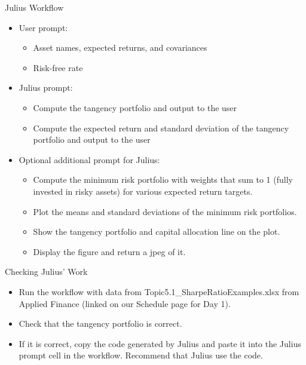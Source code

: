 \documentclass[10pt]{beamer}
\begin{document}
\begin{frame}{Julius Workflow}
  \begin{itemize}
  \item User prompt:
  \begin{itemize}
  \item Asset names, expected returns, and covariances
  \item Risk-free rate
  \end{itemize}
  \item Julius prompt:
  \begin{itemize}
  \item Compute the tangency portfolio and output to the user
  \item Compute the expected return and standard deviation of the tangency portfolio and output to the user
  \end{itemize}
  \item Optional additional prompt for Julius:
  \begin{itemize}
  \item Compute the minimum risk portfolio with weights that sum to 1 (fully invested in risky assets) for various expected return targets.
  \item  Plot the means and standard deviations of the minimum risk portfolios. 
  \item Show the tangency portfolio and capital allocation line on the plot.  
  \item Display the figure and return a jpeg of it.
  \end{itemize}
\end{itemize}
  \end{frame}
  
  \begin{frame}{Checking Julius' Work}
    \begin{itemize}
    \item Run the workflow with data from Topic5.1\_SharpeRatioExamples.xlsx from Applied Finance (linked on our Schedule page for Day 1).
    \item Check that the tangency portfolio is correct.
    \item If it is correct, copy the code generated by Julius and paste it into the Julius prompt cell in the workflow.  Recommend that Julius use the code.
    \end{itemize}
  \end{frame}
\end{document}
